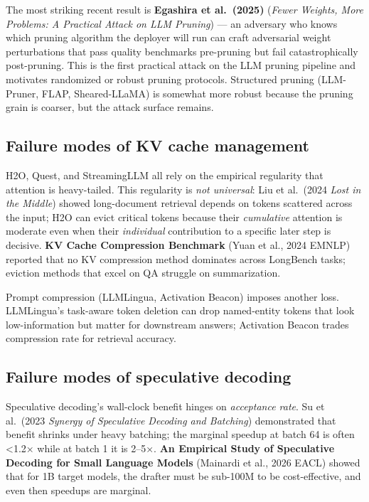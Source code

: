 The most striking recent result is \textbf{Egashira et al.~(2025)} (\emph{Fewer Weights, More Problems: A Practical Attack on LLM Pruning}) --- an adversary who knows which pruning algorithm the deployer will run can craft adversarial weight perturbations that pass quality benchmarks pre-pruning but fail catastrophically post-pruning. This is the first practical attack on the LLM pruning pipeline and motivates randomized or robust pruning protocols. Structured pruning (LLM-Pruner, FLAP, Sheared-LLaMA) is somewhat more robust because the pruning grain is coarser, but the attack surface remains.

\subsection{Failure modes of KV cache management}\label{failure-modes-of-kv-cache-management}

H2O, Quest, and StreamingLLM all rely on the empirical regularity that attention is heavy-tailed. This regularity is \emph{not universal}: Liu et al.~(2024 \emph{Lost in the Middle}) showed long-document retrieval depends on tokens scattered across the input; H2O can evict critical tokens because their \emph{cumulative} attention is moderate even when their \emph{individual} contribution to a specific later step is decisive. \textbf{KV Cache Compression Benchmark} (Yuan et al., 2024 EMNLP) reported that no KV compression method dominates across LongBench tasks; eviction methods that excel on QA struggle on summarization.

Prompt compression (LLMLingua, Activation Beacon) imposes another loss. LLMLingua's task-aware token deletion can drop named-entity tokens that look low-information but matter for downstream answers; Activation Beacon trades compression rate for retrieval accuracy.

\subsection{Failure modes of speculative decoding}\label{failure-modes-of-speculative-decoding}

Speculative decoding's wall-clock benefit hinges on \emph{acceptance rate}. Su et al.~(2023 \emph{Synergy of Speculative Decoding and Batching}) demonstrated that benefit shrinks under heavy batching; the marginal speedup at batch 64 is often \textless1.2× while at batch 1 it is 2--5×. \textbf{An Empirical Study of Speculative Decoding for Small Language Models} (Mainardi et al., 2026 EACL) showed that for 1B target models, the drafter must be sub-100M to be cost-effective, and even then speedups are marginal.


